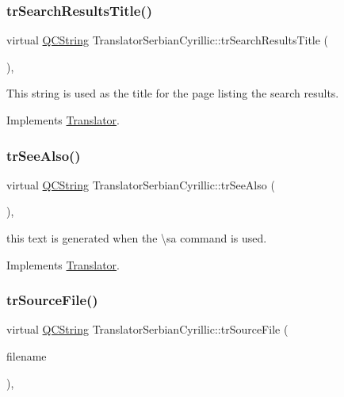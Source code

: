 \subsubsection{\texorpdfstring{trSearchResultsTitle()}{trSearchResultsTitle()}}
{\footnotesize\ttfamily virtual \mbox{\hyperlink{class_q_c_string}{Q\+C\+String}} Translator\+Serbian\+Cyrillic\+::tr\+Search\+Results\+Title (\begin{DoxyParamCaption}{ }\end{DoxyParamCaption})\hspace{0.3cm}{\ttfamily [inline]}, {\ttfamily [virtual]}}

This string is used as the title for the page listing the search results. 

Implements \mbox{\hyperlink{class_translator}{Translator}}.

\mbox{\label{class_translator_serbian_cyrillic_a8210c715c99c3d7292ac0912ffa988f2}} 
\subsubsection{\texorpdfstring{trSeeAlso()}{trSeeAlso()}}
{\footnotesize\ttfamily virtual \mbox{\hyperlink{class_q_c_string}{Q\+C\+String}} Translator\+Serbian\+Cyrillic\+::tr\+See\+Also (\begin{DoxyParamCaption}{ }\end{DoxyParamCaption})\hspace{0.3cm}{\ttfamily [inline]}, {\ttfamily [virtual]}}

this text is generated when the \textbackslash{}sa command is used. 

Implements \mbox{\hyperlink{class_translator}{Translator}}.

\mbox{\label{class_translator_serbian_cyrillic_a1875dfe0f28a1cb110700e585cee2a7a}} 
\subsubsection{\texorpdfstring{trSourceFile()}{trSourceFile()}}
{\footnotesize\ttfamily virtual \mbox{\hyperlink{class_q_c_string}{Q\+C\+String}} Translator\+Serbian\+Cyrillic\+::tr\+Source\+File (\begin{DoxyParamCaption}\item[{\mbox{\hyperlink{class_q_c_string}{Q\+C\+String}} \&}]{filename }\end{DoxyParamCaption})\hspace{0.3cm}{\ttfamily [inline]}, {\ttfamily [virtual]}}

